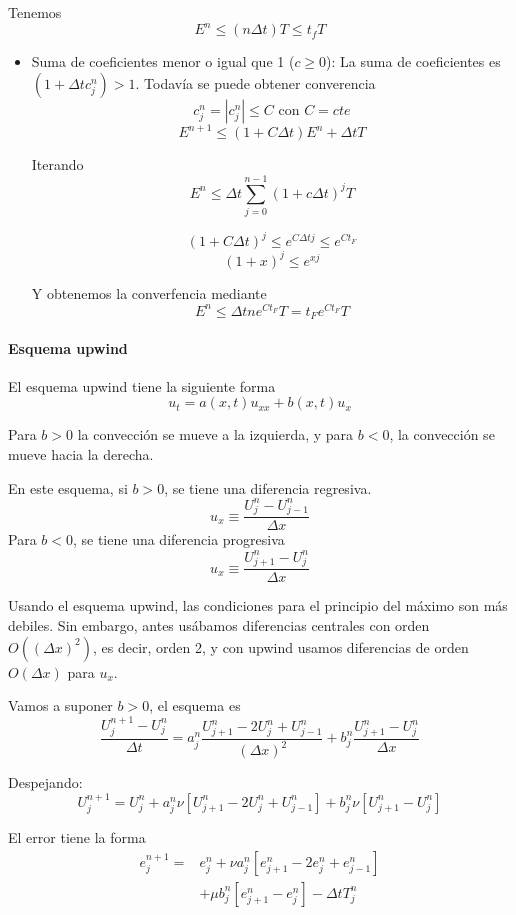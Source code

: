 Tenemos
$$E^n \le (n\Delta t)T\le t_f T$$

\begin{itemize}
	\item Suma de coeficientes menor o igual que 1 ($c\ge 0$):
	La suma de coeficientes es $(1+\Delta t c_j^n) > 1$. Todavía se puede obtener converencia
	$$c_j^n = |c_j^n| \le C \text{ con } C=cte$$
	$$E^{n+1} \le (1+C\Delta t)E^n + \Delta t T$$
	
	Iterando 
	$$E^n \le \Delta t \sum_{j=0}^{n-1} (1+c\Delta t)^j T$$
	
	$$(1+C\Delta t)^j \le e^{C\Delta t j}\le e^{C t_F}$$
	$$(1+x)^j \le e^{xj}$$
	
	Y obtenemos la converfencia mediante
	$$E^n\le \Delta t n e^{Ct_F}T = t_Fe^{Ct_F}T$$
\end{itemize}

\paragraph{Esquema upwind}
El esquema upwind tiene la siguiente forma
$$u_t = a(x,t) u_{xx} + b(x,t)u_x$$

Para $b>0$ la convección se mueve a la izquierda, y para $b<0$, la convección se mueve hacia la derecha.

En este esquema, si $b>0$, se tiene una diferencia regresiva. $$u_x \equiv \frac{U_j^n - U_{j-1}^n}{\Delta x}$$
Para $b<0$, se tiene una diferencia progresiva
$$u_x \equiv \frac{U_{j+1}^n - U_j^n}{\Delta x}$$

Usando el esquema upwind, las condiciones para el principio del máximo son más debiles. Sin embargo, antes usábamos diferencias centrales con orden $O((\Delta x)^2)$, es decir, orden 2, y con upwind usamos diferencias de orden $O(\Delta x)$ para $u_x$.

Vamos a suponer $b>0$, el esquema es
$$\frac{U_j^{n+1}-U_j^n}{\Delta t} = a_j^n\frac{U_{j+1}^{n}-2U_j^{n}+U_{j-1}^{n}}{(\Delta x)^2} + b_j^n \frac{U_{j+1}^n-U_{j}^{n}}{\Delta x}$$

Despejando:
$$U_{j}^{n+1} = U_{j}^{n} + a_j^n\nu\left[U_{j+1}^{n}-2U_{j}^{n}+U_{j-1}^{n}\right] + b_j^n \nu \left[U_{j+1}^{n}-U_{j}^{n}\right]$$

El error tiene la forma
\begin{align*}
	e_j^{n+1} = & e_j^n + \nu a_j^n\left[e_{j+1}^{n}-2e_{j}^{n}+e_{j-1}^{n}\right]\\
	& + {\mu}b_j^n\left[e_{j+1}^{n}-e_{j}^{n}\right] - \Delta t T_j^n
\end{align*}

